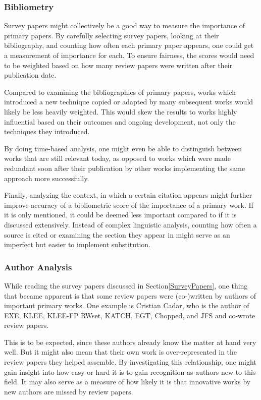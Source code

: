 \documentclass{article}
\begin{document}
\begin{multicols}{2}
    \subsubsection{Bibliometry}
    Survey papers might collectively be a good way to measure the importance of primary papers. By carefully selecting survey papers, looking at their bibliography, and counting how often each primary paper appears, one could get a measurement of importance for each. To ensure fairness, the scores would need to be weighted based on how many review papers were written after their publication date.

    Compared to examining the bibliographies of primary papers, works which introduced a new technique copied or adapted by many subsequent works would likely be less heavily weighted. This would skew the results to works highly influential based on their outcomes and ongoing development, not only the techniques they introduced.

    By doing time-based analysis, one might even be able to distinguish between works that are still relevant today, as opposed to works which were made redundant soon after their publication by other works implementing the same approach more successfully.

    Finally, analyzing the context, in which a certain citation appears might further improve accuracy of a bibliometric score of the importance of a primary work. If it is only mentioned, it could be deemed less important compared to if it is discussed extensively. Instead of complex linguistic analysis, counting how often a source is cited or examining the section they appear in might serve as an imperfect but easier to implement substitution.

    \subsubsection{Author Analysis}
    While reading the survey papers discussed in Section\ref{SurveyPapers}, one thing that became apparent is that some review papers were (co-)written by authors of important primary works. One example is Cristian Cadar, who is the author of EXE\cite{EXE}, KLEE\cite{KLEE}, KLEE-FP\cite{KLEEFP} RWset\cite{RWset}, KATCH\cite{KATCH}, EGT\cite{EGT}, Chopped\cite{Chopped}, and JFS\cite{JFS} and co-wrote review papers\cite{ReviewThreeDecades, ChallengesAndReflections, PreliminaryAssessment}.

    This is to be expected, since these authors already know the matter at hand very well. But it might also mean that their own work is over-represented in the review papers they helped assemble. By investigating this relationship, one might gain insight into how easy or hard it is to gain recognition as authors new to this field. It may also serve as a measure of how likely it is that innovative works by new authors are missed by review papers.


\end{multicols}
\end{document}
